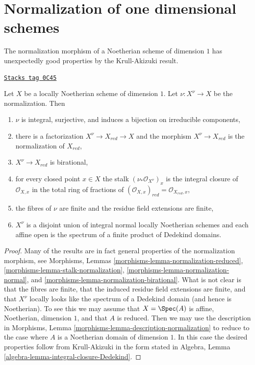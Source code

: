 \section{Normalization of one dimensional schemes}
\label{varieties-section-normalization-one-dimensional}
The normalization morphism of a Noetherian scheme of dimension
$1$ has unexpectedly good properties by the Krull-Akizuki result.

\begin{lemma}
\label{varieties-lemma-normalize-noetherian-dim-1}
\href{https://stacks.math.columbia.edu/tag/0C45}{\texttt{Stacks tag 0C45}}

Let $X$ be a locally Noetherian scheme of dimension $1$.
Let $\nu : X^\nu \to X$ be the normalization. Then
\begin{enumerate}
\item $\nu$ is integral, surjective, and induces a bijection
on irreducible components,
\item there is a factorization $X^\nu \to X_{red} \to X$
and the morphism $X^\nu \to X_{red}$ is the normalization
of $X_{red}$,
\item $X^\nu \to X_{red}$ is birational,
\item for every closed point $x \in X$ the stalk
$(\nu_*\mathcal{O}_{X^\nu})_x$ is the integral closure
of $\mathcal{O}_{X, x}$ in the total ring of fractions
of $(\mathcal{O}_{X, x})_{red} = \mathcal{O}_{X_{red}, x}$,
\item the fibres of $\nu$ are finite and the residue
field extensions are finite,
\item $X^\nu$ is a disjoint union of integral normal locally Noetherian
schemes and each affine open is the spectrum of a finite
product of Dedekind domains.
\end{enumerate}
\end{lemma}

\begin{proof}
Many of the results are in fact general properties of the normalization
morphism, see
Morphisms, Lemmas \ref{morphisms-lemma-normalization-reduced},
\ref{morphisms-lemma-stalk-normalization},
\ref{morphisms-lemma-normalization-normal}, and
\ref{morphisms-lemma-normalization-birational}.
What is not clear is that the fibres are finite,
that the induced residue field extensions are finite, and
that $X^\nu$ locally looks like the spectrum of a
Dedekind domain (and hence is Noetherian).
To see this we may assume that $X = \Spec(A)$ is
affine, Noetherian, dimension $1$, and that $A$ is reduced.
Then we may use the description in
Morphisms, Lemma \ref{morphisms-lemma-description-normalization}
to reduce to the case where $A$ is a Noetherian domain
of dimension $1$. In this case the desired properties
follow from Krull-Akizuki in the form stated in
Algebra, Lemma \ref{algebra-lemma-integral-closure-Dedekind}.
\end{proof}


